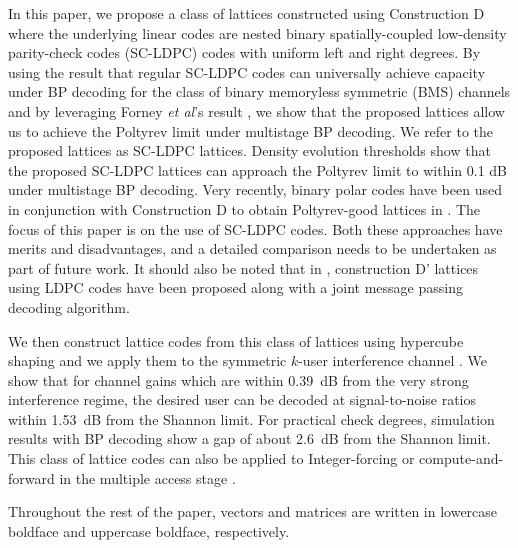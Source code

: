 \documentclass[conference]{IEEEtran}
\begin{document}
In this paper, we propose a class of lattices constructed using Construction D \cite{BarnesSloane83} where the underlying linear codes are nested binary spatially-coupled low-density parity-check codes (SC-LDPC) codes with uniform left and right degrees. By using the result that regular SC-LDPC codes can universally achieve capacity under BP decoding for the class of binary memoryless symmetric (BMS) channels  \cite{kudekaruniversal,kumar2012proof} and by leveraging Forney {\em et al}'s result \cite{forney2000}, we show that the proposed lattices allow us to achieve the Poltyrev
limit under multistage BP decoding. We refer to the proposed lattices as SC-LDPC lattices. Density evolution thresholds show that the proposed SC-LDPC lattices can approach the Poltyrev limit to within 0.1 dB under multistage BP decoding. Very recently, binary polar codes have been used in conjunction with Construction D to obtain Poltyrev-good lattices in \cite{YanLingWu13}. The focus of this paper is on the use of SC-LDPC codes. Both these approaches have merits and disadvantages, and a detailed comparison needs to be undertaken as part of future work. It should also be noted that in \cite{sadeghi06}, construction D' lattices using LDPC codes have been proposed along with a joint message passing decoding algorithm.

We then construct lattice codes from this class of lattices using hypercube shaping and we apply them to the symmetric $k$-user interference channel \cite{sridharan2008capacity}. We show that for channel gains which are within 0.39~dB from the very strong interference regime, the desired user can be decoded at signal-to-noise ratios within 1.53~dB from the Shannon limit. For practical check degrees, simulation results with BP decoding show a gap of about 2.6~dB from the Shannon limit. This class of lattice codes can also be applied to Integer-forcing or compute-and-forward in the multiple access stage \cite{nazer2011CF}.


Throughout the rest of the paper, vectors and matrices are written in lowercase boldface and uppercase boldface, respectively.
\end{document}
